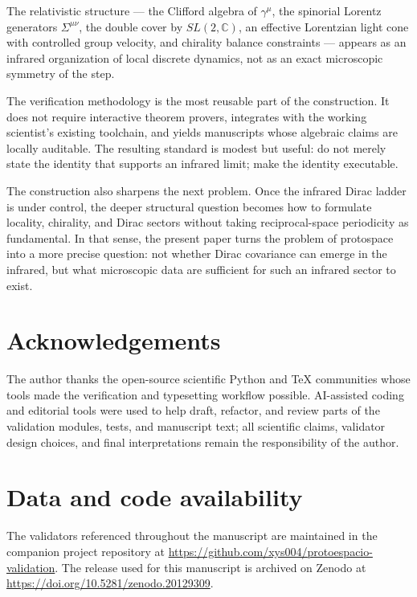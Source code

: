 \documentclass[a4paper,onecolumn,11pt]{quantumarticle}
\newcommand{\bbC}{\ensuremath{\mathbb{C}}}
\begin{document}
The relativistic structure --- the Clifford algebra of $\gamma^{\mu}$, the spinorial Lorentz generators $\Sigma^{\mu\nu}$, the double cover by $SL(2,\bbC)$, an effective Lorentzian light cone with controlled group velocity, and chirality balance constraints --- appears as an infrared organization of local discrete dynamics, not as an exact microscopic symmetry of the step.

The verification methodology is the most reusable part of the construction. It does not require interactive theorem provers, integrates with the working scientist's existing toolchain, and yields manuscripts whose algebraic claims are locally auditable. The resulting standard is modest but useful: do not merely state the identity that supports an infrared limit; make the identity executable.

The construction also sharpens the next problem. Once the infrared Dirac ladder is under control, the deeper structural question becomes how to formulate locality, chirality, and Dirac sectors without taking reciprocal-space periodicity as fundamental. In that sense, the present paper turns the problem of protospace into a more precise question: not whether Dirac covariance can emerge in the infrared, but what microscopic data are sufficient for such an infrared sector to exist.

\section*{Acknowledgements}
The author thanks the open-source scientific Python and TeX communities whose tools made the verification and typesetting workflow possible. AI-assisted coding and editorial tools were used to help draft, refactor, and review parts of the validation modules, tests, and manuscript text; all scientific claims, validator design choices, and final interpretations remain the responsibility of the author.

\section*{Data and code availability}
The validators referenced throughout the manuscript are maintained in the companion project repository at \url{https://github.com/xys004/protoespacio-validation}. The release used for this manuscript is archived on Zenodo at \url{https://doi.org/10.5281/zenodo.20129309}.
\end{document}
